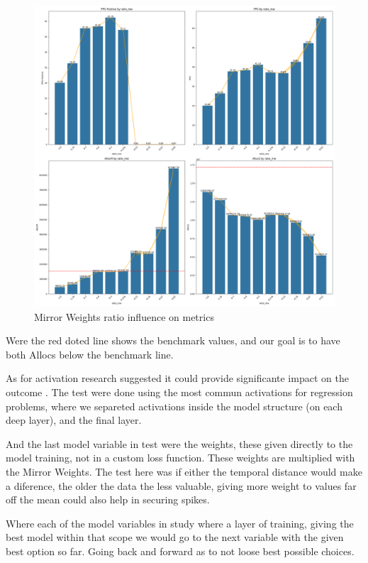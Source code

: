 \begin{figure}[H]
    \centering
    \includegraphics[width=\textwidth]{plots/article_ratio_mw.png}
    \caption{Mirror Weights ratio influence on metrics}
    \label{fig:Ratio_influence_on_metrics}
  \end{figure}
Were the red doted line shows the benchmark values, and our goal is to have both Allocs below the benchmark line.\par
As for activation research suggested it could  provide significante impact on the outcome \cite{Vaswani2017} \cite{Liu2022}. The test were done using the most commun activations for regression problems, where we separeted activations inside the model structure (on each deep layer), and the final layer.\par
And the last model variable in test were the weights, these given directly to the model training, not in a custom loss function. These weights are multiplied with the Mirror Weights. The test here was if either the temporal distance would make a diference, the older the data the less valuable, giving more weight to values far off the mean could also help in securing spikes.\par

Where each of the model variables in study where a layer of training, giving the best model within that scope we would go to the next variable with the given best option so far. Going back and forward as to not loose best possible choices.\par


